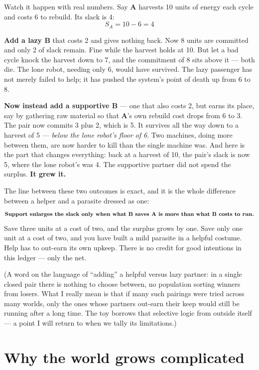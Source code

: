 \documentclass{article}
\begin{document}
Watch it happen with real numbers. Say \textbf{A} harvests 10 units of energy each cycle and costs 6 to rebuild. Its slack is 4:
\[
S_A = 10 - 6 = 4
\]

\textbf{Add a lazy \textbf{B}} that costs 2 and gives nothing back. Now 8 units are committed and only 2 of slack remain. Fine while the harvest holds at 10. But let a bad cycle knock the harvest down to 7, and the commitment of 8 sits above it --- both die. The lone robot, needing only 6, would have survived. The lazy passenger has not merely failed to help; it has pushed the system's point of death up from 6 to 8.

\textbf{Now instead add a supportive \textbf{B}} --- one that also costs 2, but earns its place, say by gathering raw material so that \textbf{A}'s own rebuild cost drops from 6 to 3. The pair now commits 3 plus 2, which is 5. It survives all the way down to a harvest of 5 --- \emph{below the lone robot's floor of 6}. Two machines, doing more between them, are now harder to kill than the single machine was. And here is the part that changes everything: back at a harvest of 10, the pair's slack is now 5, where the lone robot's was 4. The supportive partner did not spend the surplus. \textbf{It grew it.}

The line between these two outcomes is exact, and it is the whole difference between a helper and a parasite dressed as one:
\[
\text{\textbf{Support enlarges the slack only when what \textbf{B} saves \textbf{A} is more than what \textbf{B} costs to run.}}
\]
Save three units at a cost of two, and the surplus grows by one. Save only one unit at a cost of two, and you have built a mild parasite in a helpful costume. Help has to out-earn its own upkeep. There is no credit for good intentions in this ledger --- only the net.

(A word on the language of ``adding'' a helpful versus lazy partner: in a single closed pair there is nothing to choose between, no population sorting winners from losers. What I really mean is that if many such pairings were tried across many worlds, only the ones whose partners out-earn their keep would still be running after a long time. The toy borrows that selective logic from outside itself --- a point I will return to when we tally its limitations.)

\section*{Why the world grows complicated}
\end{document}
